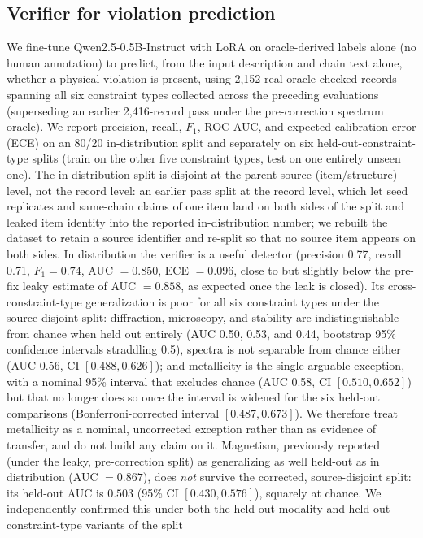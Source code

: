 \documentclass[pdflatex,sn-nature]{sn-jnl}
\begin{document}
\subsection*{Verifier for violation prediction}
We fine-tune Qwen2.5-0.5B-Instruct with LoRA on oracle-derived labels alone (no human
annotation) to predict, from the input description and chain text alone, whether a
physical violation is present, using 2{,}152 real oracle-checked records spanning all
six constraint types collected across the preceding evaluations (superseding an earlier
2{,}416-record pass under the pre-correction spectrum oracle). We report precision,
recall, $F_1$, ROC AUC, and expected calibration error (ECE) on an 80/20
in-distribution split and separately on six held-out-constraint-type splits (train on the
other five constraint types, test on one entirely unseen one). The in-distribution split
is disjoint at the parent source (item/structure) level, not the record level: an earlier
pass split at the record level, which let seed replicates and same-chain claims of one item
land on both sides of the split and leaked item identity into the reported in-distribution
number; we rebuilt the dataset to retain a source identifier and re-split so that no source
item appears on both sides. In distribution the
verifier is a useful
detector (precision 0.77, recall 0.71, $F_1=0.74$, AUC $=0.850$, ECE $=0.096$, close to but
slightly below the pre-fix leaky estimate of AUC $=0.858$, as expected once the leak is
closed). Its
cross-constraint-type generalization is poor for all six constraint types under the
source-disjoint split: diffraction, microscopy, and stability
are indistinguishable from chance when held out entirely (AUC 0.50, 0.53, and 0.44,
bootstrap 95\% confidence intervals straddling 0.5), spectra is not separable from chance either (AUC
0.56, CI $[0.488,0.626]$); and metallicity is the single arguable exception, with a nominal
95\% interval that excludes chance (AUC 0.58, CI $[0.510,0.652]$) but that no longer does so
once the interval is widened for the six held-out comparisons (Bonferroni-corrected interval
$[0.487,0.673]$). We therefore treat metallicity as a nominal, uncorrected exception rather
than as evidence of transfer, and do not build any claim on it. Magnetism, previously reported (under
the leaky, pre-correction split) as generalizing as well held-out as in distribution
(AUC $=0.867$), does \emph{not} survive the corrected, source-disjoint split: its held-out
AUC is $0.503$ (95\% CI $[0.430,0.576]$), squarely at chance. We independently confirmed
this under both the held-out-modality and held-out-constraint-type variants of the split
\end{document}
